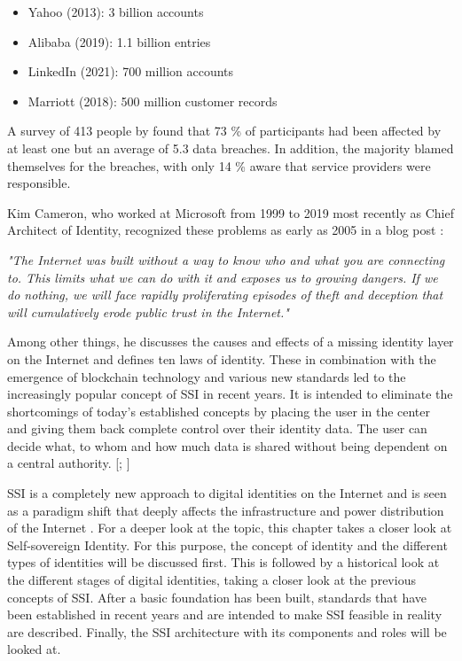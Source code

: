\begin{itemize}
    \item Yahoo (2013): 3 billion accounts
    \item Alibaba (2019): 1.1 billion entries
    \item LinkedIn (2021): 700 million accounts
    \item Marriott (2018): 500 million customer records
\end{itemize}

A survey of 413 people by \cite{mayer_now_2021} found that 73 \% of participants had been affected by at least one but an average of 5.3 data breaches. In addition, the majority blamed themselves for the breaches, with only 14 \% aware that service providers were responsible.

Kim Cameron, who worked at Microsoft from 1999 to 2019 most recently as Chief Architect of Identity, recognized these problems as early as 2005 in a blog post \cite{cameron_laws_2005}:

\begin{displayquote}
    \textit{"The Internet was built without a way to know who and what you are connecting to. This limits what we can do with it and exposes us to growing dangers. If we do nothing, we will face rapidly proliferating episodes of theft and deception that will cumulatively erode public trust in the Internet."}
\end{displayquote}

Among other things, he discusses the causes and effects of a missing identity layer on the Internet and defines ten laws of identity. These in combination with the emergence of blockchain technology and various new standards led to the increasingly popular concept of \acf{SSI} in recent years. It is intended to eliminate the shortcomings of today's established concepts by placing the user in the center and giving them back complete control over their identity data. The user can decide what, to whom and how much data is shared without being dependent on a central authority. [\citealp[pp. 6-7]{struker_grundlagen_2021}; \citealp[pp. 8-9]{tobin_inevitable_2017}]

\ac{SSI} is a completely new approach to digital identities on the Internet and is seen as a paradigm shift that deeply affects the infrastructure and power distribution of the Internet \cite[p. 3]{reed_decentralized_2021}. For a deeper look at the topic, this chapter takes a closer look at Self-sovereign Identity. For this purpose, the concept of identity and the different types of identities will be discussed first. This is followed by a historical look at the different stages of digital identities, taking a closer look at the previous concepts of \ac{SSI}. After a basic foundation has been built, standards that have been established in recent years and are intended to make \ac{SSI} feasible in reality are described. Finally, the \ac{SSI} architecture with its components and roles will be looked at.

